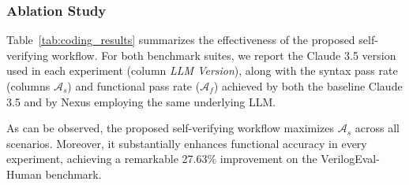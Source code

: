 \subsubsection{Ablation Study}
Table~\ref{tab:coding_results} summarizes the effectiveness of the proposed self-verifying workflow. For both benchmark suites, we report the Claude 3.5 version used in each experiment (column {\em LLM Version}), along with the syntax pass rate (columns $\mathcal{A}_{s}$) and functional pass rate ($\mathcal{A}_{f}$) achieved by both the baseline Claude 3.5 and by Nexus employing the same underlying LLM.

\begin{table}[!h]
    \centering
    \vspace{8pt}
    \caption{Ablation study results on pass rate, with column {\bf $\Delta\mathcal{A}_{f}$} reporting the percentage improvement of the proposed workflow over the corresponding baseline model in terms of functional pass rate. All values are expressed as percentages.}
    \label{tab:coding_results}
\end{table}

As can be observed, the proposed self-verifying workflow maximizes $\mathcal{A}_{s}$ across all scenarios. Moreover, it substantially enhances functional accuracy in every experiment, achieving a remarkable 27.63\% improvement on the VerilogEval-Human benchmark.

